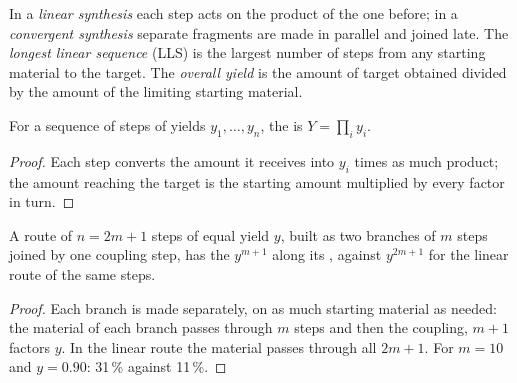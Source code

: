 \begin{definition}\label{def:b3:total-synthesis:architecture}
In a \emph{linear synthesis} each step acts on the
product of the one before; in a \emph{convergent synthesis}
separate fragments are made in parallel and joined late. The
\emph{longest linear sequence} (LLS) is the
largest number of steps from any starting material to the target. The
\emph{overall yield} is the amount of target obtained
divided by the amount of the limiting starting material.
\end{definition}

\begin{proposition}\label{prop:b3:total-synthesis:overall-yield}
For a sequence of steps of yields $y_1, \dots, y_n$, the  is $Y = \prod_i y_i$.
\end{proposition}

\begin{proof}
Each step converts the amount it receives into $y_i$ times as much product; the
amount reaching the target is the starting amount multiplied by every factor in
turn.
\end{proof}

\begin{proposition}[Convergence]\label{prop:b3:total-synthesis:convergent}
A route of $n = 2m + 1$ steps of equal yield $y$, built as two branches of $m$ steps joined by
one coupling step, has the  $y^{m+1}$ along its ,
against $y^{2m+1}$ for the linear route of the same steps.
\end{proposition}

\begin{proof}
Each branch is made separately, on as much starting material as needed: the
material of each branch passes through $m$ steps and then the coupling, $m + 1$
factors $y$. In the linear route the material passes through all $2m + 1$. For $m = 10$
and $y = 0.90$: 31\,\% against 11\,\%.
\end{proof}

